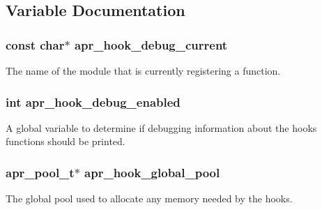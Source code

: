\subsection{Variable Documentation}
\hypertarget{group___a_p_r___util___hook_ga37be3c217439ceddbda16054b020a658}{
\subsubsection[{apr\-\_\-hook\-\_\-debug\-\_\-current}]{\setlength{\rightskip}{0pt plus 5cm}const char$\ast$ apr\-\_\-hook\-\_\-debug\-\_\-current}}\label{group___a_p_r___util___hook_ga37be3c217439ceddbda16054b020a658}
The name of the module that is currently registering a function. \hypertarget{group___a_p_r___util___hook_ga59309caeb9b47d921727530494f264be}{
\subsubsection[{apr\-\_\-hook\-\_\-debug\-\_\-enabled}]{\setlength{\rightskip}{0pt plus 5cm}int apr\-\_\-hook\-\_\-debug\-\_\-enabled}}\label{group___a_p_r___util___hook_ga59309caeb9b47d921727530494f264be}
A global variable to determine if debugging information about the hooks functions should be printed. \hypertarget{group___a_p_r___util___hook_ga8911bb699a5f03ad3c36d579ca0eca23}{
\subsubsection[{apr\-\_\-hook\-\_\-global\-\_\-pool}]{\setlength{\rightskip}{0pt plus 5cm}apr\-\_\-pool\-\_\-t$\ast$ apr\-\_\-hook\-\_\-global\-\_\-pool}}\label{group___a_p_r___util___hook_ga8911bb699a5f03ad3c36d579ca0eca23}
The global pool used to allocate any memory needed by the hooks. 